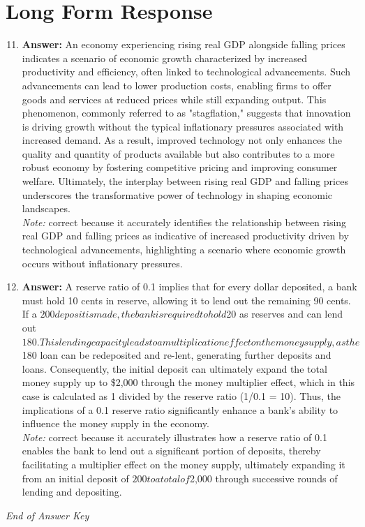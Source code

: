 \documentclass[12pt]{article}
\begin{document}
\section*{Long Form Response}
\begin{enumerate}[label=\arabic*.]
\setcounter{enumi}{10}
\item \textbf{Answer:} An economy experiencing rising real GDP alongside falling prices indicates a scenario of economic growth characterized by increased productivity and efficiency, often linked to technological advancements. Such advancements can lead to lower production costs, enabling firms to offer goods and services at reduced prices while still expanding output. This phenomenon, commonly referred to as "stagflation," suggests that innovation is driving growth without the typical inflationary pressures associated with increased demand. As a result, improved technology not only enhances the quality and quantity of products available but also contributes to a more robust economy by fostering competitive pricing and improving consumer welfare. Ultimately, the interplay between rising real GDP and falling prices underscores the transformative power of technology in shaping economic landscapes.
\\ \textit{Note:} correct because it accurately identifies the relationship between rising real GDP and falling prices as indicative of increased productivity driven by technological advancements, highlighting a scenario where economic growth occurs without inflationary pressures.
\item \textbf{Answer:} A reserve ratio of 0.1 implies that for every dollar deposited, a bank must hold 10 cents in reserve, allowing it to lend out the remaining 90 cents. If a $200 deposit is made, the bank is required to hold $20 as reserves and can lend out $180. This lending capacity leads to a multiplication effect on the money supply, as the $180 loan can be redeposited and re-lent, generating further deposits and loans. Consequently, the initial deposit can ultimately expand the total money supply up to \$2,000 through the money multiplier effect, which in this case is calculated as 1 divided by the reserve ratio (1/0.1 = 10). Thus, the implications of a 0.1 reserve ratio significantly enhance a bank's ability to influence the money supply in the economy.
\\ \textit{Note:} correct because it accurately illustrates how a reserve ratio of 0.1 enables the bank to lend out a significant portion of deposits, thereby facilitating a multiplier effect on the money supply, ultimately expanding it from an initial deposit of $200 to a total of $2,000 through successive rounds of lending and depositing.
\end{enumerate}

\vfill
\noindent\textit{End of Answer Key}
\end{document}
